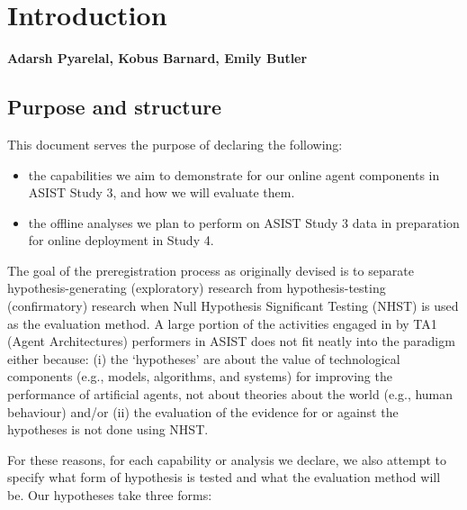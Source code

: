 \chapter{Introduction}
\textbf{Adarsh Pyarelal, Kobus Barnard, Emily Butler}

\section{Purpose and structure}

This document serves the purpose of declaring the following:

\begin{itemize}
    \item the capabilities we aim to demonstrate for our online agent
        components in ASIST Study 3, and how we will evaluate them.
    \item the offline analyses we plan to perform on ASIST Study 3 data
        in preparation for online deployment in Study 4.
\end{itemize}


The goal of the preregistration process as originally devised
\citep{Nosek.ea:2018} is to separate hypothesis-generating (exploratory)
research from hypothesis-testing (confirmatory) research when Null Hypothesis
Significant Testing (NHST) is used as the evaluation method. A large portion of
the activities engaged in by TA1 (Agent Architectures) performers in ASIST does
not fit neatly into the paradigm either because: (i) the `hypotheses' are about
the value of technological components (e.g., models, algorithms, and systems)
for improving the performance of artificial agents, not about theories about
the world (e.g., human behaviour) and/or (ii) the evaluation of the evidence
for or against the hypotheses is not done using NHST.

For these reasons, for each capability or analysis we declare, we also attempt
to specify what form of hypothesis is tested and what the evaluation method
will be. Our hypotheses take three forms:

